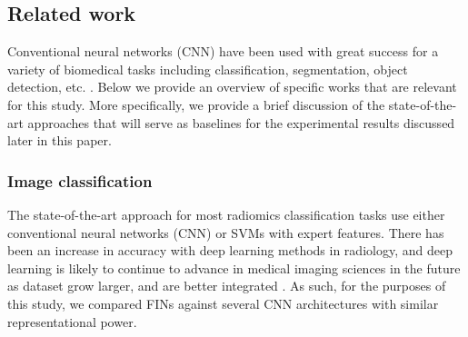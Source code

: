 \documentclass{article}
\begin{document}


 \subsection{Related work}
Conventional neural networks (CNN) have been used with great success for a variety of biomedical tasks including classification, segmentation, object detection, etc. \cite{puttagunta2021medical}. Below we provide an overview of specific works that are relevant for this study. More specifically, we provide a brief discussion of the state-of-the-art approaches that will serve as baselines for the experimental results discussed later in this paper.

\subsubsection{Image classification}
The state-of-the-art approach for most radiomics classification tasks use either conventional neural networks (CNN) or SVMs with expert features. There has been an increase in accuracy with deep learning methods in radiology, and deep learning is likely to continue to advance in medical imaging sciences in the future as dataset grow larger, and are better integrated \cite{SABA201914}. As such, for the purposes of this study, we compared FINs against several CNN architectures with similar representational power.
\end{document}
